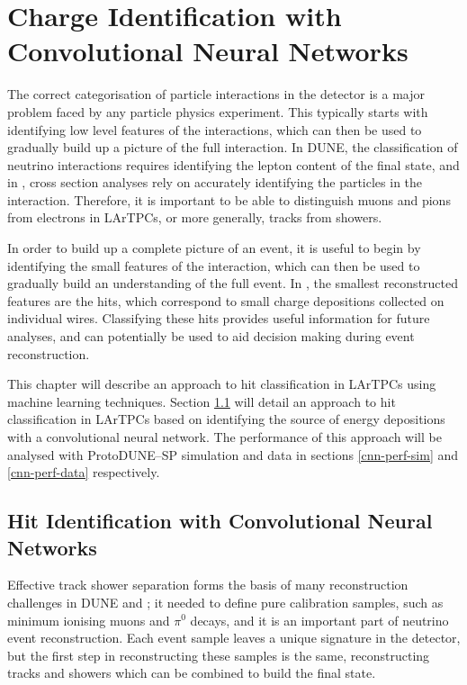 \chapter{\label{ch:chargeid}Charge Identification with Convolutional Neural 
Networks} 

\minitoc

The correct categorisation of particle interactions in the detector is a major
problem faced by any particle physics experiment. This typically starts with
identifying low level features of the interactions, which can then be used to
gradually build up a picture of the full interaction. In DUNE, the
classification of neutrino interactions requires identifying the lepton content
of the final state, and in \protodune{}, cross section analyses rely on
accurately identifying the particles in the interaction. Therefore, it is
important to be able to distinguish muons and pions from electrons in LArTPCs, 
or more generally, tracks from showers.

In order to build up a complete picture of an event, it is useful to begin by
identifying the small features of the interaction, which can then be used to
gradually build an understanding of the full event. In \protodune{}, the
smallest reconstructed features are the hits, which correspond to small charge 
depositions collected on individual wires. Classifying these hits provides
useful information for future analyses, and can potentially be used to aid
decision making during event reconstruction.

This chapter will describe an approach to hit classification in LArTPCs using
machine learning techniques. Section \ref{hit-id} will detail an approach to 
hit classification in LArTPCs based on identifying the source of energy 
depositions with a convolutional neural network.  The performance of this 
approach will be analysed with ProtoDUNE--SP simulation and data in sections 
\ref{cnn-perf-sim} and \ref{cnn-perf-data} respectively.

\section{Hit Identification with Convolutional Neural Networks} \label{hit-id}

Effective track shower separation forms the basis of many reconstruction
challenges in DUNE and \protodune{}; it needed to define pure calibration
samples, such as minimum ionising muons and $\pi^0$ decays, and it is an
important part of neutrino event reconstruction. Each event sample leaves a
unique signature in the detector, but the first step in reconstructing these
samples is the same, reconstructing tracks and showers which can be combined to
build the final state. 


